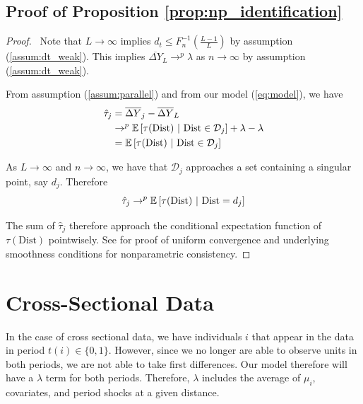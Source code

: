 \documentclass[10pt]{article}
\newcommand{\dist}{\text{Dist}}
\begin{document}
\subsection{Proof of Proposition \ref{prop:np_identification}}

\begin{proof}
    \ Note that $L \to \infty$ implies $d_t \leq F_n^{-1}(\frac{L-1}{L})$ by assumption (\ref{assum:dt_weak}). This implies $\overline{\Delta Y}_L \to^p \lambda$ as $n \to \infty$ by assumption (\ref{assum:dt_weak}). 
    
    From assumption (\ref{assum:parallel}) and from our model (\ref{eq:model}), we have
    \begin{align*}
        \hat{\tau}_j &= \overline{\Delta Y}_j - \overline{\Delta Y}_L \\
        &\to^p \condexpec{\tau(\dist)}{\dist \in \mathcal{D}_j} + \lambda - \lambda \\
        &= \condexpec{\tau(\dist)}{\dist \in \mathcal{D}_j}
    \end{align*}

    As $L \to \infty$ and $n \to \infty$, we have that $\mathcal{D}_j$ approaches a set containing a singular point, say $d_j$. Therefore 
    $$ 
        \hat{\tau}_j \to^p \condexpec{\tau(\dist)}{\dist = d_j}
    $$

    The sum of $\hat{\tau}_j$ therefore approach the conditional expectation function of $\tau(\dist)$ pointwisely. See \citet{Cattaneo_Farrell_Feng_2019} for proof of uniform convergence and underlying smoothness conditions for nonparametric consistency.
\end{proof}




\section{Cross-Sectional Data}

In the case of cross sectional data, we have individuals $i$ that appear in the data in period $t(i) \in \{0,1\}$. However, since we no longer are able to observe units in both periods, we are not able to take first differences. Our model therefore will have a $\lambda$ term for both periods. Therefore, $\lambda$ includes the average of $\mu_i$, covariates, and period shocks at a given distance.
\end{document}
